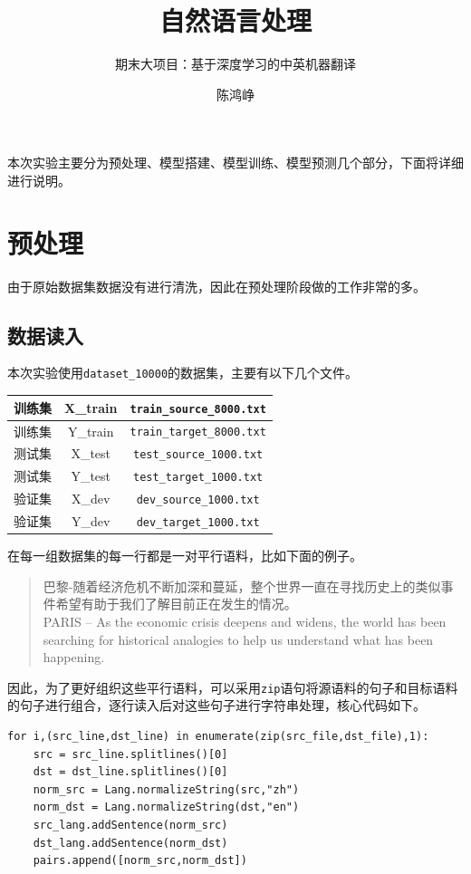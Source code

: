 \documentclass[logo,reportComp]{thesis}
\title{自然语言处理}
\subtitle{期末大项目：基于深度学习的中英机器翻译}
\author{陈鸿峥}
\begin{document}
\maketitle
\tableofcontents

\newpage

本次实验主要分为预处理、模型搭建、模型训练、模型预测几个部分，下面将详细进行说明。

\section{预处理}
由于原始数据集数据没有进行清洗，因此在预处理阶段做的工作非常的多。

\subsection{数据读入}
本次实验使用\verb'dataset_10000'的数据集，主要有以下几个文件。
\begin{table}[H]
\centering
\begin{tabular}{|c|c|c|}\hline
训练集 & X\_train & \verb'train_source_8000.txt'\\\hline
训练集 & Y\_train & \verb'train_target_8000.txt'\\\hline
测试集 & X\_test & \verb'test_source_1000.txt'\\\hline
测试集 & Y\_test & \verb'test_target_1000.txt'\\\hline
验证集 & X\_dev & \verb'dev_source_1000.txt'\\\hline
验证集 & Y\_dev & \verb'dev_target_1000.txt'\\\hline
\end{tabular}
\end{table}

在每一组数据集的每一行都是一对平行语料，比如下面的例子。
\begin{quote}
巴黎-随着经济危机不断加深和蔓延，整个世界一直在寻找历史上的类似事件希望有助于我们了解目前正在发生的情况。\\
PARIS -- As the economic crisis deepens and widens, the world has been searching for historical analogies to help us understand what has been happening.
\end{quote}

因此，为了更好组织这些平行语料，可以采用\verb'zip'语句将源语料的句子和目标语料的句子进行组合，逐行读入后对这些句子进行字符串处理，核心代码如下。
\begin{lstlisting}
for i,(src_line,dst_line) in enumerate(zip(src_file,dst_file),1):
    src = src_line.splitlines()[0]
    dst = dst_line.splitlines()[0]
    norm_src = Lang.normalizeString(src,"zh")
    norm_dst = Lang.normalizeString(dst,"en")
    src_lang.addSentence(norm_src)
    dst_lang.addSentence(norm_dst)
    pairs.append([norm_src,norm_dst])
\end{lstlisting}
\end{document}
